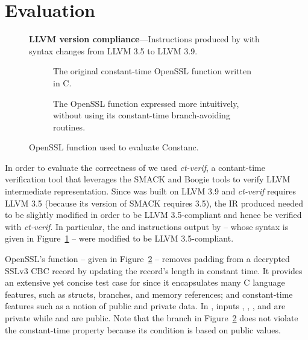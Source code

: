 \section{Evaluation}
\label{sec:evaluation}

\begin{figure}
	
	\caption{\textbf{LLVM version compliance}---Instructions produced by \constc with syntax changes from LLVM 3.5 to LLVM 3.9.}
	\label{table:llvm-instr-syntax}\floatspace
\end{figure}

\begin{figure*}
    \centering
    \begin{subfigure}[b]{0.49\textwidth}
		\dbox{}
		\caption{The original constant-time OpenSSL function written in C.\newline}
		\label{fig:openssl-original}
    \end{subfigure}
    \begin{subfigure}[b]{0.49\textwidth}
		\dbox{}
		\caption{The OpenSSL function expressed more intuitively, without using its constant-time branch-avoiding routines.}
		\label{fig:openssl-intuitive}
    \end{subfigure}
    \caption{OpenSSL function used to evaluate Constanc.}\label{fig:openssl}\floatspace
\end{figure*}

In order to evaluate the correctness of \constc we used \emph{ct-verif}\cite{almeida2016}, a contant-time verification tool that leverages the SMACK and Boogie tools to verify LLVM intermediate representation. Since \constc was built on LLVM 3.9 and \emph{ct-verif} requires LLVM 3.5 (because its version of SMACK requires 3.5), the IR \constc produced needed to be slightly modified in order to be LLVM 3.5-compliant and hence be verified with \emph{ct-verif}. In particular, the  and  instructions output by \constc -- whose syntax is given in Figure~\ref{table:llvm-instr-syntax} -- were modified to be LLVM 3.5-compliant.

OpenSSL's  function -- given in Figure~\ref{fig:openssl-original} -- removes padding from a decrypted SSLv3 CBC record by updating the record's length in constant time. It provides an extensive yet concise test case for \constc since it encapsulates many C language features, such as structs, branches, and memory references; and constant-time features such as a notion of public and private data. In , inputs , , , and  are private while  and  are public. Note that the branch in Figure~\ref{fig:openssl-original} does not violate the constant-time property because its condition is based on public values.

